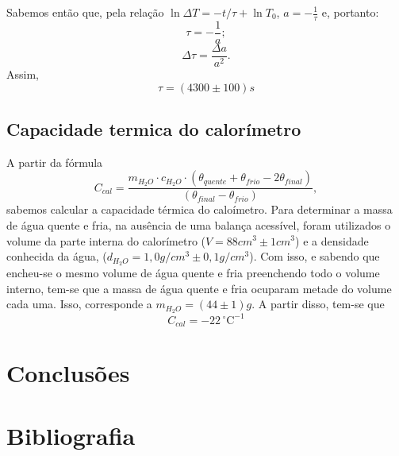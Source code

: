 \documentclass[12pt,a4paper]{article}
\begin{document}
Sabemos então que, pela relação $ \ln \Delta T = -t/\tau + \ln T_0 $, $a = -\frac{1}{\tau}$ e, portanto:
$$ \tau = -\frac{1}{a}; $$
$$ \Delta\tau =\frac{\Delta a}{a^2}. $$
Assim, 
$$ \tau = (4300 \pm 100)s $$
\subsection{Capacidade termica do calorímetro}

A partir da fórmula $$C_{cal} = \frac{m_{H_2O}\cdot c_{H_2O}\cdot(\theta_{quente} + \theta_{frio} -2\theta_{final})}{(\theta_{final}-\theta_{frio})},$$
sabemos calcular a capacidade térmica do caloímetro.
Para determinar a massa de água quente e fria, na ausência de uma balança acessível, foram utilizados o volume da parte interna do calorímetro ($V = 88cm^3 \pm 1cm^3$) e a densidade conhecida da água, ($d_{H_2O} = 1,0g/cm^3 \pm 0,1 g/cm^3$). Com isso, e sabendo que encheu-se o mesmo volume de água quente e fria preenchendo todo o volume interno, tem-se que a massa de água quente e fria ocuparam metade do volume cada uma. Isso, corresponde a $ m_{H_2O} = (44 \pm 1)g$.
A partir disso, tem-se que
$$C_{cal} = -22 \,^{\circ}\mathrm{C}^{-1} $$

\section{Conclusões}


\section{Bibliografia}
\end{document}
